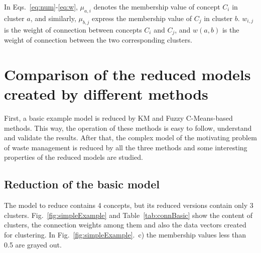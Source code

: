 \documentclass[graybox]{svmult}
\begin{document}
In Eqs.~\ref{eq:num}-\ref{eq:w}, $\mu_{a,i}$ denotes the membership 
value of concept $C_i$ in cluster $a$, and similarly, $\mu_{b,j}$ 
express the membership value of $C_j$ in cluster $b$. $w_{i,j}$ is the 
weight of connection between concepts $C_i$ and $C_j$, and $w(a,b)$ is 
the weight of connection between the two corresponding clusters.

\section{Comparison of the reduced models created by different methods}

First, a basic example model is reduced by KM and Fuzzy C-Means-based 
methods. This way, the operation of these methods is easy to follow, 
understand and validate the results. After that, the complex model of 
the motivating problem of waste management is reduced by all the three 
methods and some interesting properties of the reduced models are 
studied.

\subsection{Reduction of the basic model}

The model to reduce contains 4 concepts, but its reduced versions 
contain only 3 clusters. Fig.~\ref{fig:simpleExample} and 
Table~\ref{tab:connBasic} show the content of clusters, the connection 
weights among them and also the data vectors created for clustering. In 
Fig.~\ref{fig:simpleExample}.~c) the membership values less than 0.5 
are grayed out.
\end{document}
